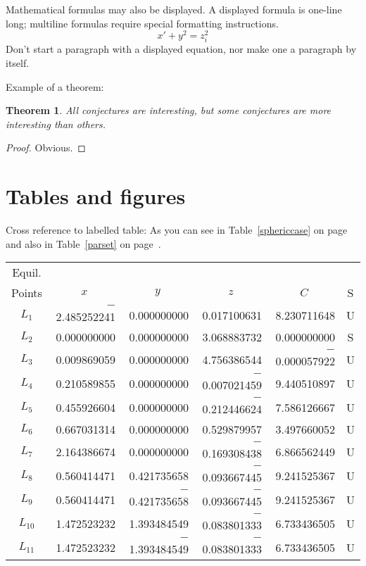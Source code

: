 \documentclass[joc]{ipart}
\theoremstyle{plain}
\newtheorem{thm}{Theorem}[section]
\begin{document}
Mathematical formulas may also be displayed.  A displayed formula is
one-line long; multiline formulas require special formatting
instructions.
   \[  x' + y^{2} = z_{i}^{2}\]
Don't start a paragraph with a displayed equation, nor make
one a paragraph by itself.

Example of a theorem:


\begin{thm}
All conjectures are interesting, but some conjectures are more
interesting than others.
\end{thm}

\begin{proof}
Obvious.
\end{proof}

\section{Tables and figures}
Cross reference to labelled table: As you can see in Table~\ref{sphericcase} on
page~\pageref{sphericcase} and also in Table~\ref{parset} on page~\pageref{parset}.


\begin{table*}
\caption{The spherical case ($I_1=0$, $I_2=0$)}
\label{sphericcase}
\begin{tabular*}{\textwidth}{@{\extracolsep{\fill}}crrrrc}
\hline
Equil. \\
Points & \multicolumn{1}{c}{$x$} & \multicolumn{1}{c}{$y$} & \multicolumn{1}{c}{$z$} & \multicolumn{1}{c}{$C$} &
S \\
\hline
$L_1$ & $-$2.485252241 & 0.000000000 & 0.017100631 & 8.230711648 & U \\
$L_2$ &    0.000000000 & 0.000000000 & 3.068883732 & 0.000000000 & S \\
$L_3$ &    0.009869059 & 0.000000000 & 4.756386544 & $-$0.000057922 & U \\
$L_4$ &    0.210589855 & 0.000000000 & $-$0.007021459 & 9.440510897 & U \\
$L_5$ &    0.455926604 & 0.000000000 & $-$0.212446624 & 7.586126667 & U \\
$L_6$ &    0.667031314 & 0.000000000 & 0.529879957 & 3.497660052 & U \\
$L_7$ &    2.164386674 & 0.000000000 & $-$0.169308438 & 6.866562449 & U \\
$L_8$ &    0.560414471 & 0.421735658 & $-$0.093667445 & 9.241525367 & U \\
$L_9$ &    0.560414471 & $-$0.421735658 & $-$0.093667445 & 9.241525367 & U
\\
$L_{10}$ & 1.472523232 & 1.393484549 & $-$0.083801333 & 6.733436505 & U \\
$L_{11}$ & 1.472523232 & $-$1.393484549 & $-$0.083801333 & 6.733436505 & U
\\ \hline
\end{tabular*}
\end{table*}
\end{document}
